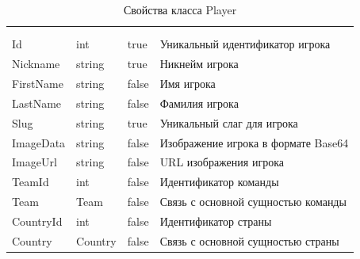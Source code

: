 \begin{xltabular}{\textwidth}{|X|X|X|X|}
	\caption{Свойства класса Player}\label{table:Player}\\ \hline
	 &  &  &  \\ \hline
	 &  &  &  \\ \hline
	\endfirsthead
	 \hline
	 &  &  &  \\ \hline
	\endhead
	Id & int & true & Уникальный идентификатор игрока \\ \hline
	Nickname & string & true & Никнейм игрока \\ \hline
	FirstName & string & false & Имя игрока \\ \hline
	LastName & string & false & Фамилия игрока \\ \hline
	Slug & string & true & Уникальный слаг для игрока \\ \hline
	ImageData & string & false & Изображение игрока в формате Base64 \\ \hline
	ImageUrl & string & false & URL изображения игрока \\ \hline
	TeamId & int & false & Идентификатор команды \\ \hline
	Team & Team & false & Связь с основной сущностью команды \\ \hline
	CountryId & int & false & Идентификатор страны \\ \hline
	Country & Country & false & Связь с основной сущностью страны \\ \hline
\end{xltabular}

